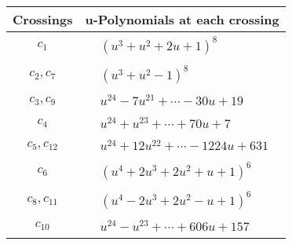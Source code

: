 \documentclass[1p]{elsarticle_modified}
\theoremstyle{definition}
\begin{document}
\begin{tabular}{m{50pt}|m{274pt}}
Crossings & \hspace{64pt}u-Polynomials at each crossing \\
\hline $$\begin{aligned}c_{1}\end{aligned}$$&$\begin{aligned}
&(u^3+u^2+2 u+1)^8
\end{aligned}$\\
\hline $$\begin{aligned}c_{2},c_{7}\end{aligned}$$&$\begin{aligned}
&(u^3+u^2-1)^8
\end{aligned}$\\
\hline $$\begin{aligned}c_{3},c_{9}\end{aligned}$$&$\begin{aligned}
&u^{24}-7 u^{21}+\cdots-30 u+19
\end{aligned}$\\
\hline $$\begin{aligned}c_{4}\end{aligned}$$&$\begin{aligned}
&u^{24}+u^{23}+\cdots+70 u+7
\end{aligned}$\\
\hline $$\begin{aligned}c_{5},c_{12}\end{aligned}$$&$\begin{aligned}
&u^{24}+12 u^{22}+\cdots-1224 u+631
\end{aligned}$\\
\hline $$\begin{aligned}c_{6}\end{aligned}$$&$\begin{aligned}
&(u^4+2 u^3+2 u^2+u+1)^6
\end{aligned}$\\
\hline $$\begin{aligned}c_{8},c_{11}\end{aligned}$$&$\begin{aligned}
&(u^4-2 u^3+2 u^2- u+1)^6
\end{aligned}$\\
\hline $$\begin{aligned}c_{10}\end{aligned}$$&$\begin{aligned}
&u^{24}- u^{23}+\cdots+606 u+157
\end{aligned}$\\
\hline
\end{tabular}\\~\\
\end{document}
